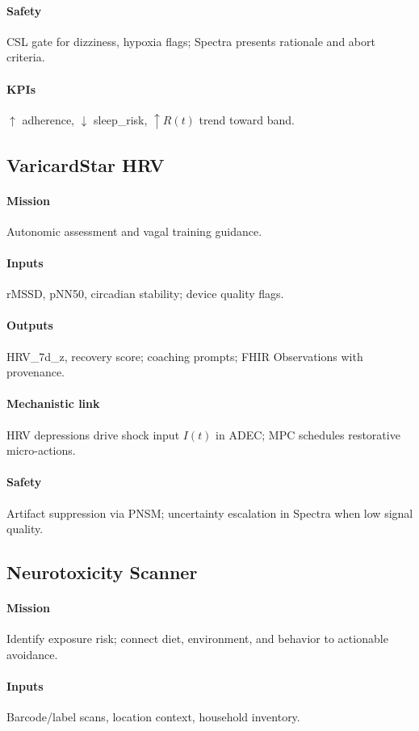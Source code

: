 \documentclass[11pt]{article}
\theoremstyle{plain}
\begin{document}
\paragraph{Safety} CSL gate for dizziness, hypoxia flags; Spectra presents rationale and abort criteria.
\paragraph{KPIs} $\uparrow$ adherence, $\downarrow$ sleep\_risk, $\uparrow R(t)$ trend toward band.

\subsection{VaricardStar HRV}
\paragraph{Mission} Autonomic assessment and vagal training guidance.
\paragraph{Inputs} rMSSD, pNN50, circadian stability; device quality flags.
\paragraph{Outputs} HRV\_7d\_z, recovery score; coaching prompts; FHIR Observations with provenance.
\paragraph{Mechanistic link} HRV depressions drive shock input $I(t)$ in ADEC; MPC schedules restorative micro-actions.
\paragraph{Safety} Artifact suppression via PNSM; uncertainty escalation in Spectra when low signal quality.

\subsection{Neurotoxicity Scanner}
\paragraph{Mission} Identify exposure risk; connect diet, environment, and behavior to actionable avoidance.
\paragraph{Inputs} Barcode/label scans, location context, household inventory.
\end{document}
